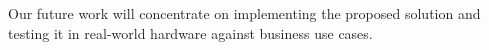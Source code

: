 \documentclass[twocolumn]{svjour3}          %
\begin{document}
Our future work will concentrate on implementing the proposed solution and testing it in real-world hardware against business use cases.


%
%



\end{document}
